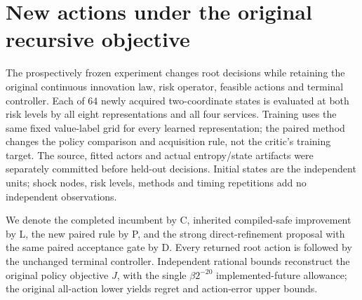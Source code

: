 \section{New actions under the original recursive objective}\label{sec:results120}

The prospectively frozen experiment changes root decisions while retaining the original continuous innovation law, risk operator, feasible actions and terminal controller. Each of 64 newly acquired two-coordinate states is evaluated at both risk levels by all eight representations and all four services. Training uses the same fixed value-label grid for every learned representation; the paired method changes the policy comparison and acquisition rule, not the critic's training target. The source, fitted actors and actual entropy/state artifacts were separately committed before held-out decisions. Initial states are the independent units; shock nodes, risk levels, methods and timing repetitions add no independent observations.

We denote the completed incumbent by C, inherited compiled-safe improvement by L, the new paired rule by P, and the strong direct-refinement proposal with the same paired acceptance gate by D. Every returned root action is followed by the unchanged terminal controller. Independent rational bounds reconstruct the original policy objective $J$, with the single $\beta 2^{-20}$ implemented-future allowance; the original all-action lower yields regret and action-error upper bounds.

